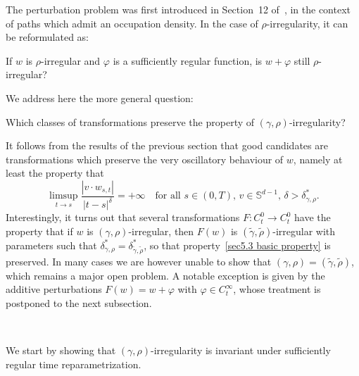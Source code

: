 \documentclass[10pt]{article}
\begin{document}
The perturbation problem was first introduced in Section~12 of~{\cite{geman}},
in the context of paths which admit an occupation density. In the case of
$\rho$\mbox{-}irregularity, it can be reformulated as:

\begin{center}
  If $w$ is $\rho$-irregular and $\varphi$ is a sufficiently regular function,
  is $w + \varphi$ still $\rho$-irregular?
\end{center}

We address here the more general question:

\begin{center}
  Which classes of transformations preserve the property of $(\gamma,
  \rho)$\mbox{-}irregularity?
\end{center}

It follows from the results of the previous section that good candidates are
transformations which preserve the very oscillatory behaviour of $w$, namely
at least the property that
\begin{equation}
  \limsup_{t \rightarrow s} \frac{| v \cdot w_{s, t} |}{| t - s |^{\delta}} =
  + \infty \quad \text{for all } s \in (0, T), \, v \in \mathbb{S}^{d - 1}, \,
  \delta > \delta^{\ast}_{\gamma, \rho} . \label{sec5.3 basic property}
\end{equation}
Interestingly, it turns out that several transformations $F : C^0_t
\rightarrow C^0_t$ have the property that if $w$ is $(\gamma,
\rho)$\mbox{-}irregular, then $F (w)$ is $(\tilde{\gamma},
\tilde{\rho})$\mbox{-}irregular with parameters such that
$\delta^{\ast}_{\gamma, \rho} = \delta^{\ast}_{\tilde{\gamma}, \tilde{\rho}}$,
so that property~\eqref{sec5.3 basic property} is preserved. In many cases we
are however unable to show that $(\gamma, \rho) = (\tilde{\gamma},
\tilde{\rho})$, which remains a major open problem. A notable exception is
given by the additive perturbations $F (w) = w + \varphi$ with $\varphi \in
C^{\infty}_t$, whose treatment is postponed to the next subsection.

\

We start by showing that $(\gamma, \rho)$\mbox{-}irregularity is invariant
under sufficiently regular time reparametrization.
\end{document}
